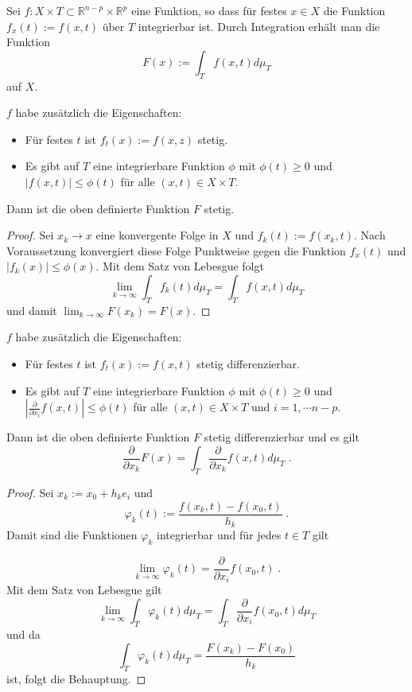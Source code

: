 Sei $f: X \times T \subset \mathbb{R}^{n-p} \times \mathbb{R}^p$ eine Funktion, so dass für festes $x \in X$ die Funktion $f_x(t) := f(x,t)$ über $T$ integrierbar ist. Durch Integration erhält man die Funktion 
$$ F(x) := \int_T f(x,t)  d \mu_T$$ 
auf $X$.

\begin{Satz}[Stetigkeitssatz]
$f$ habe zusätzlich die Eigenschaften:
\begin{itemize}
\item Für festes $t$ ist $f_t(x):= f(x,z)$ stetig.
\item Es gibt auf $T$ eine integrierbare Funktion $\phi$ mit $\phi(t) \geq 0$ und $|f(x,t)| \leq \phi(t)$ für alle $(x,t) \in X \times T$.
\end{itemize}
Dann ist die oben definierte Funktion $F$ stetig. 
\end{Satz}
\begin{proof}
Sei  $x_k \to x$   eine konvergente Folge in $X$ und $f_k(t):= f(x_k,t)$. Nach Voraussetzung konvergiert diese Folge Punktweise gegen die Funktion $f_x(t)$ und $| f_k (x) | \leq \phi(x)$. Mit dem Satz von Lebesgue folgt
$$ \lim_{k \to \infty} \int_T f_k(t) d \mu_T = \int_T f(x,t) d \mu_T$$
und damit $ \lim_{k \to \infty} F(x_k) =  F(x)$.
\end{proof}

\begin{Satz}[Differentiationssatz]
$f$ habe zusätzlich die Eigenschaften:
\begin{itemize}
\item Für festes $t$ ist $f_t(x):= f(x,t)$ stetig differenzierbar.
\item Es gibt auf $T$ eine integrierbare Funktion $\phi$ mit $\phi(t) \geq 0$ und $| \frac{\partial}{\partial x_i} f(x,t)| \leq \phi(t)$ für alle $(x,t) \in X \times T$ und $i=1, \cdots n-p$.
\end{itemize}
Dann ist die oben definierte Funktion $F$ stetig differenzierbar und es gilt
$$\frac{\partial}{\partial x_k} F(x)  = \int_T \frac{\partial}{\partial x_k} f(x,t) d \mu_T \; .$$ 
\end{Satz}
\begin{proof}
Sei $x_k := x_0 + h_k e_i$ und 
$$ \varphi_k (t) := \frac{f(x_k,t)  - f(x_0,t)  }{h_k} \; .$$
Damit sind die Funktionen  $\varphi_k $ integrierbar und für jedes $t \in T$ gilt

$$  \lim_{k \to \infty} \varphi_k (t) = \frac{\partial}{\partial x_i}f(x_0, t) \; .$$
Mit dem Satz von Lebesgue gilt
$$ \lim_{k \to \infty}  \int_T \varphi_k (t) d \mu_T = \int_T   \frac{\partial}{\partial x_i}f(x_0, t) d \mu_T $$
und da 
$$  \int_T \varphi_k (t) d \mu_T = \frac{F(x_k) -F(x_0)}{h_k}$$ ist, folgt die Behauptung.
 
\end{proof}




